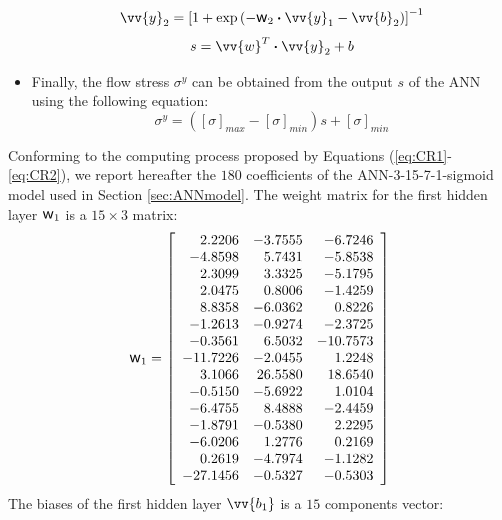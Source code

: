 \documentclass[twoside,english,1p,final,sort&compress]{elsarticle}
\theoremstyle{plain}
\newcommand{\w}{\mbox{\large\ensuremath{\mathsf{w}}}}
\newcommand{\dotp}{\boldsymbol{\cdot}}
\renewcommand{\overrightarrow}{\vv}
\begin{document}
\begin{itemize}
\begin{equation}
\overrightarrow{y}_2 = \left[1 + \exp{\left(- \w_2 \dotp \overrightarrow{y}_1- \overrightarrow{b}_2\right)}\right]^{-1}
\end{equation}
\begin{equation}
s = \overrightarrow{w}^T \dotp \overrightarrow{y}_2 + b
\end{equation}
\item Finally, the flow stress $\sigma^y$ can be obtained from the output $s$ of the ANN using the following equation:
\begin{equation}
\sigma^y =  \left([\sigma]_{max}-[\sigma]_{min}\right)s + [\sigma]_{min} \label{eq:CR2}
\end{equation}
\end{itemize}

Conforming to the computing process proposed by Equations (\ref{eq:CR1}-\ref{eq:CR2}), we report hereafter the $180$ coefficients of the ANN-3-15-7-1-sigmoid model used in Section \ref{sec:ANNmodel}.
The weight matrix for the first hidden layer $\w_1$ is a $15\times3$ matrix:
\begin{equation*}
\w_1 = \left[
\begin{array}{rrr}
2.2206 & -3.7555 & -6.7246\\ 
-4.8598 & 5.7431 & -5.8538\\ 
2.3099 & 3.3325 & -5.1795\\ 
2.0475 & 0.8006 & -1.4259\\ 
8.8358 & -6.0362 & 0.8226\\ 
-1.2613 & -0.9274 & -2.3725\\ 
-0.3561 & 6.5032 & -10.7573\\ 
-11.7226 & -2.0455 & 1.2248\\ 
3.1066 & 26.5580 & 18.6540\\ 
-0.5150 & -5.6922 & 1.0104\\ 
-6.4755 & 8.4888 & -2.4459\\ 
-1.8791 & -0.5380 & 2.2295\\ 
-6.0206 & 1.2776 & 0.2169\\ 
0.2619 & -4.7974 & -1.1282\\ 
-27.1456 & -0.5327 & -0.5303\\ 
\end{array}\right]
\end{equation*}
The biases of the first hidden layer $\overrightarrow{b_1}$ is a $15$ components vector:
\end{document}
